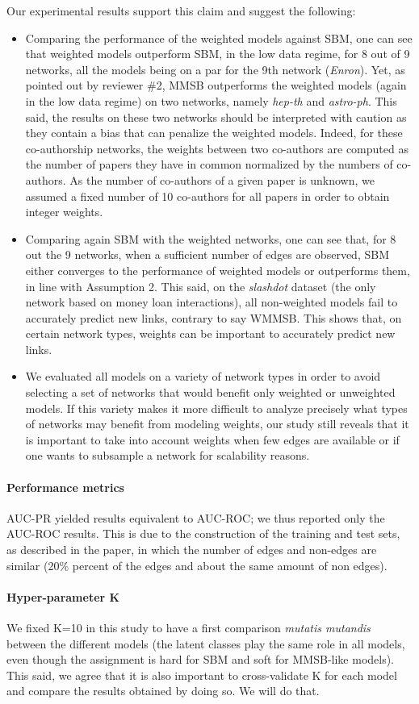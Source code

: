 \documentclass{article}
\begin{document}
%
Our experimental results support this claim and suggest the following:
%
\begin{itemize}
\item Comparing the performance of the weighted models against SBM, one can see that weighted models outperform SBM, in the low data regime, for 8 out of 9 networks, all the models being on a par for the 9th network (\textit{Enron}). Yet, as pointed out by reviewer \#2, MMSB outperforms the weighted models (again in the low data regime) on two networks, namely \textit{hep-th} and \textit{astro-ph}. This said, the results on these two networks should be interpreted with caution as they contain a bias that can penalize the weighted models. Indeed, for these co-authorship networks, the weights between two co-authors are computed as the number of papers they have in common normalized by the numbers of co-authors. As the number of co-authors of a given paper is unknown, we assumed a fixed number of 10 co-authors for all papers in order to obtain integer weights.
\item Comparing again SBM with the weighted networks, one can see that, for 8 out the 9 networks, when a sufficient number of edges are observed, SBM either converges to the performance of weighted models or outperforms them, in line with Assumption 2. This said, on the \textit{slashdot} dataset (the only network based on money loan interactions), all non-weighted models fail to accurately predict new links, contrary to say WMMSB. This shows that, on certain network types, weights can be important to accurately predict new links.
\item We evaluated all models on a variety of network types in order to avoid selecting a set of networks that would benefit only weighted or unweighted models. If this variety makes it more difficult to analyze precisely what types of networks may benefit from modeling weights, our study still reveals that it is important to take into account weights when few edges are available or if one wants to subsample a network for scalability reasons.
\end{itemize}

\paragraph{Performance metrics}  AUC-PR yielded results equivalent to AUC-ROC; we thus reported only the AUC-ROC results. This is due to the construction of the training and test sets, as described in the paper, in which the number of edges and non-edges are similar (20\% percent of the edges and about the same amount of non edges).

\paragraph{Hyper-parameter K} We fixed K=10 in this study to have a first comparison \textit{mutatis mutandis} between the different models (the latent classes play the same role in all models, even though the assignment is hard for SBM and soft for MMSB-like models). This said, we agree that it is also important to cross-validate K for each model and compare the results obtained by doing so. We will do that.
\end{document}
